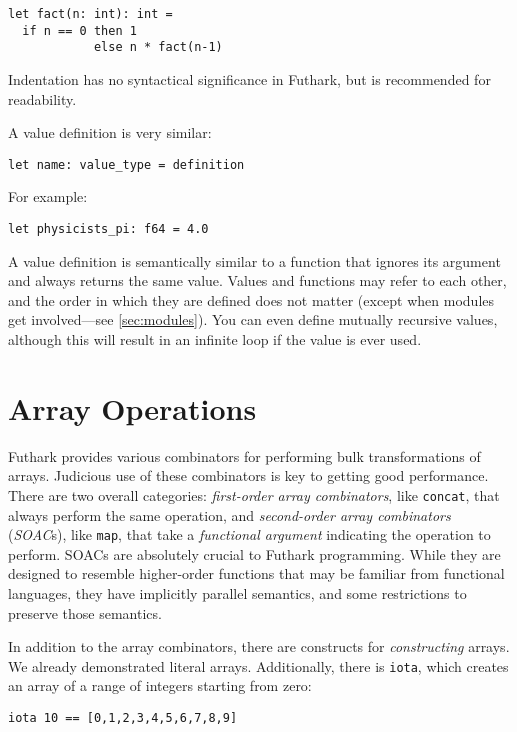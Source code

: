\documentclass[oneside,11pt]{book}
\begin{document}
\begin{lstlisting}
let fact(n: int): int =
  if n == 0 then 1
            else n * fact(n-1)
\end{lstlisting}

\noindent
Indentation has no syntactical significance in Futhark, but is
recommended for readability.

A value definition is very similar:

\begin{lstlisting}
let name: value_type = definition
\end{lstlisting}

\noindent
For example:

\begin{lstlisting}
let physicists_pi: f64 = 4.0
\end{lstlisting}

A value definition is semantically similar to a function that ignores
its argument and always returns the same value.  Values and functions
may refer to each other, and the order in which they are defined does
not matter (except when modules get involved---see \ref{sec:modules}).
You can even define mutually recursive values, although this will
result in an infinite loop if the value is ever used.

\section{Array Operations}

Futhark provides various combinators for performing bulk
transformations of arrays.  Judicious use of these combinators is key
to getting good performance.  There are two overall categories:
\textit{first-order array combinators}, like \texttt{concat}, that
always perform the same operation, and \textit{second-order array
  combinators} (\textit{SOAC}s), like \texttt{map}, that take a
\textit{functional argument} indicating the operation to perform.
SOACs are absolutely crucial to Futhark programming.  While they are
designed to resemble higher-order functions that may be familiar from
functional languages, they have implicitly parallel semantics, and
some restrictions to preserve those semantics.

In addition to the array combinators, there are constructs for
\textit{constructing} arrays.  We already demonstrated literal arrays.
Additionally, there is \texttt{iota}, which creates an array of a
range of integers starting from zero:

\begin{lstlisting}
iota 10 == [0,1,2,3,4,5,6,7,8,9]
\end{lstlisting}
\end{document}

